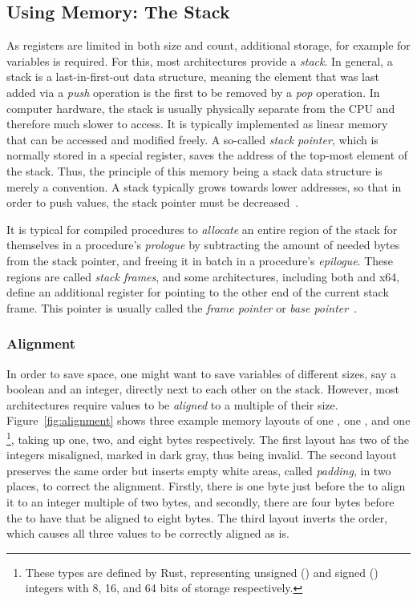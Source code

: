 \subsection{Using Memory: The Stack}

As registers are limited in both size and count, additional storage, for example for variables is required.
For this, most architectures provide a \emph{stack}.
In general, a stack is a last-in-first-out data structure, meaning the element that was last added via a \emph{push} operation is the first to be removed by a \emph{pop} operation.
In computer hardware, the stack is usually physically separate from the CPU and therefore much slower to access.
It is typically implemented as linear memory that can be accessed and modified freely.
A so-called \emph{stack pointer}, which is normally stored in a special register, saves the address of the top-most element of the stack.
Thus, the principle of this memory being a stack data structure is merely a convention.
A stack typically grows towards lower addresses, so that in order to push values, the stack pointer must be decreased~\cite[pp.~68,99,100]{Patterson2017-zq}.

It is typical for compiled procedures to \emph{allocate} an entire region of the stack for themselves in a procedure's \emph{prologue} by subtracting the amount of needed bytes from the stack pointer, and freeing it in batch in a procedure's \emph{epilogue}.
These regions are called \emph{stack frames}, and some architectures, including both \riscv{} and x64, define an additional register for pointing to the other end of the current stack frame.
This pointer is usually called the \emph{frame pointer} or \emph{base pointer}~\cite[p.~94]{Waldron1998}.

\subsubsection{Alignment}

In order to save space, one might want to save variables of different sizes, say a boolean and an integer, directly next to each other on the stack.
However, most architectures require values to be \emph{aligned} to a multiple of their size.
Figure~\ref{fig:alignment} shows three example memory layouts of one , one , and one \footnote{These types are defined by Rust, representing unsigned () and signed () integers with 8, 16, and 64 bits of storage respectively.}, taking up one, two, and eight bytes respectively.
The first layout has two of the integers misaligned, marked in dark gray, thus being invalid.
The second layout preserves the same order but inserts empty white areas, called \emph{padding}, in two places, to correct the alignment.
Firstly, there is one byte just before the  to align it to an integer multiple of two bytes, and secondly, there are four bytes before the  to have that be aligned to eight bytes.
The third layout inverts the order, which causes all three values to be correctly aligned as is.

